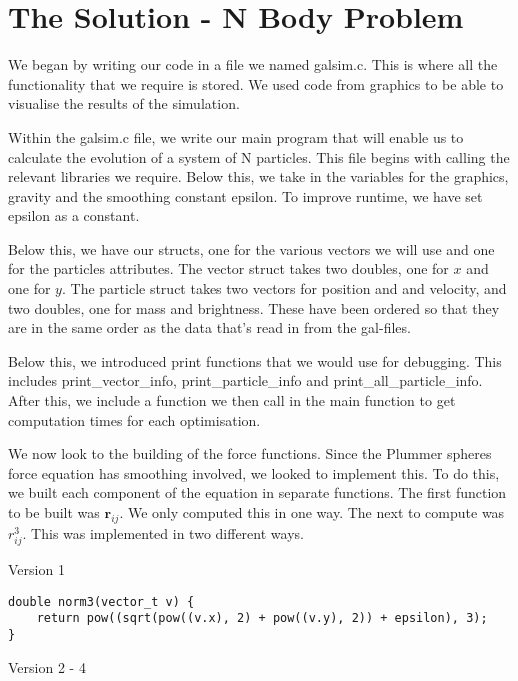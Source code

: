 \section{The Solution - N Body Problem}
We began by writing our code in a file we named galsim.c. This is where all the functionality that we require is stored. We used code from graphics to be able to visualise the results of the simulation.

Within the galsim.c file, we write our main program that will enable us to calculate the evolution of a system of N particles. This file begins with calling the relevant libraries we require. Below this, we take in the variables for the graphics, gravity and the smoothing constant epsilon. To improve runtime, we have set epsilon as a constant.

Below this, we have our structs, one for the various vectors we will use and one for the particles attributes. The vector struct takes two doubles, one for $x$ and one for $y$. The particle struct takes two vectors for position and and velocity, and two doubles, one for mass and brightness. These have been ordered so that they are in the same order as the data that's read in from the gal-files.

Below this, we introduced print functions that we would use for debugging. This includes print\_vector\_info, print\_particle\_info and print\_all\_particle\_info. After this, we include a function we then call in the main function to get computation times for each optimisation.

We now look to the building of the force functions. Since the Plummer spheres force equation has smoothing involved, we looked to implement this. To do this, we built each component of the equation in separate functions. The first function to be built was $\boldsymbol{r}_{ij}$. We only computed this in one way. The next to compute was $r_{ij}^{3}$. This was implemented in two different ways.

\begin{center}
    Version 1
\end{center}

\begin{lstlisting}
double norm3(vector_t v) {
    return pow((sqrt(pow((v.x), 2) + pow((v.y), 2)) + epsilon), 3);
}
\end{lstlisting}

\begin{center}
    Version 2 - 4
\end{center}

